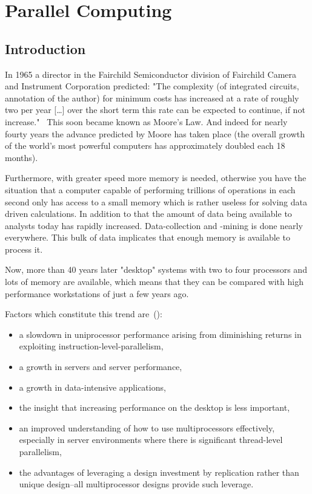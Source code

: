 \chapter{Parallel Computing}
\label{chap:parallelcomputing}
\section{Introduction}

In 1965 a director in the Fairchild Semiconductor division of
Fairchild Camera and Instrument Corporation predicted: "The complexity
(of integrated circuits, annotation of the author)
for minimum costs has increased at a rate of roughly two per year
[\ldots] over the short term this rate can be expected to continue, if
not increase."~\cite{moore65integratedcircuits} This soon became known
as Moore's Law. And 
indeed for nearly fourty years the advance predicted by Moore has
taken place (the overall growth of the world's most powerful computers
has approximately doubled each 18 months).

Furthermore, with greater speed more memory is needed, otherwise you have
the situation that a computer capable of performing trillions of
operations in each second only has access to a small memory which is
rather useless for solving data driven calculations. In addition to
that the amount of data being available to analysts today has rapidly
increased. Data-collection and -mining is done nearly everywhere. This
bulk of data implicates that enough memory is available to process it.

Now, more than 40 years later "desktop" systems with two to four
processors and lots of memory are available, which means that they can
be compared with high performance workstations of just a few years
ago.

Factors which constitute this trend are~(\cite{C1quant07}):
\begin{itemize}
\item a slowdown in uniprocessor performance arising from  diminishing
  returns in exploiting instruction-level-parallelism,
\item a growth in servers and server performance,
\item a growth in data-intensive applications,
\item the insight that increasing performance on the desktop is less
  important,
\item an improved understanding of how to use multiprocessors
  effectively, especially in server environments where there is
  significant thread-level parallelism,
\item the advantages of leveraging a design investment by replication
  rather than unique design--all multiprocessor designs provide such leverage.
\end{itemize}

